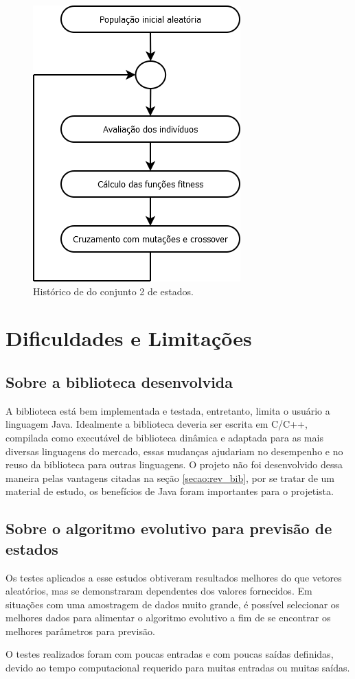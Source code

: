 \begin{figure}[htb]
    \caption{Histórico de \fitness do conjunto 2 de estados.}
    \label{figura:resultado_79}
    \centering
    \includegraphics[scale=1]{images/dia/fluxograma-ae}
    \fautor
\end{figure}

\section{Dificuldades e Limitações}

\subsection{Sobre a biblioteca desenvolvida}

A biblioteca está bem implementada e testada, entretanto, limita o usuário a linguagem Java. Idealmente a biblioteca deveria ser escrita em C/C++, compilada como executável de biblioteca dinâmica e adaptada para as mais diversas linguagens do mercado, essas mudanças ajudariam no desempenho e no reuso da biblioteca para outras linguagens. O projeto não foi desenvolvido dessa maneira pelas vantagens citadas na seção \ref{secao:rev_bib}, por se tratar de um material de estudo, os benefícios de Java foram importantes para o projetista.

\subsection{Sobre o algoritmo evolutivo para previsão de estados}

Os testes aplicados a esse estudos obtiveram resultados melhores do que vetores aleatórios, mas se demonstraram dependentes dos valores fornecidos. Em situações com uma amostragem de dados muito grande, é possível selecionar os melhores dados para alimentar o algoritmo evolutivo a fim de se encontrar os melhores parâmetros para previsão.

O testes realizados foram com poucas entradas e com poucas saídas definidas, devido ao tempo computacional requerido para muitas entradas ou muitas saídas.
